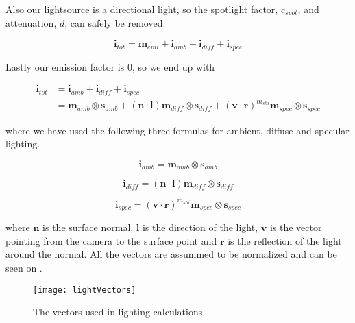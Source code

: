 Also our lightsource is a directional light, so the spotlight factor,
$c_{spot}$, and attenuation, $d$, can safely be removed.

\begin{displaymath}
  \mathbf{i}_{tot} = \mathbf{m}_{emi} + \mathbf{i}_{amb} + \mathbf{i}_{diff} + \mathbf{i}_{spec}
\end{displaymath}

Lastly our emission factor is 0, so we end up with

\begin{displaymath}
  \begin{array}{rl}
    \mathbf{i}_{tot} &= \mathbf{i}_{amb} + \mathbf{i}_{diff} +
    \mathbf{i}_{spec}\\
    &= \mathbf{m}_{amb} \otimes \mathbf{s}_{amb} + (\mathbf{n} \cdot
    \mathbf{l}) \mathbf{m}_{diff} \otimes \mathbf{s}_{diff} +
    (\mathbf{v} \cdot \mathbf{r})^{m_{shi}} \mathbf{m}_{spec} \otimes
    \mathbf{s}_{spec} 
  \end{array}
\end{displaymath}

where we have used the following three formulas for ambient, diffuse
and specular lighting.

\begin{displaymath}
  \mathbf{i}_{amb} = \mathbf{m}_{amb} \otimes \mathbf{s}_{amb} 
\end{displaymath}

\begin{displaymath}
  \mathbf{i}_{diff} = (\mathbf{n} \cdot \mathbf{l}) \mathbf{m}_{diff} \otimes \mathbf{s}_{diff} 
\end{displaymath}

\begin{displaymath}
  \mathbf{i}_{spec} = (\mathbf{v} \cdot \mathbf{r})^{m_{shi}} \mathbf{m}_{spec} \otimes \mathbf{s}_{spec} 
\end{displaymath}

where $\mathbf{n}$ is the surface normal, $\mathbf{l}$ is the
direction of the light, $\mathbf{v}$ is the vector pointing from the
camera to the surface point and $\mathbf{r}$ is the reflection of the
light around the normal. All the vectors are assummed to be normalized
and can be seen on .

\begin{figure}
  \centering
  \label{fig:lightVectors}
  \texttt{[image: lightVectors]}
  \caption{The vectors used in lighting calculations}
\end{figure}

